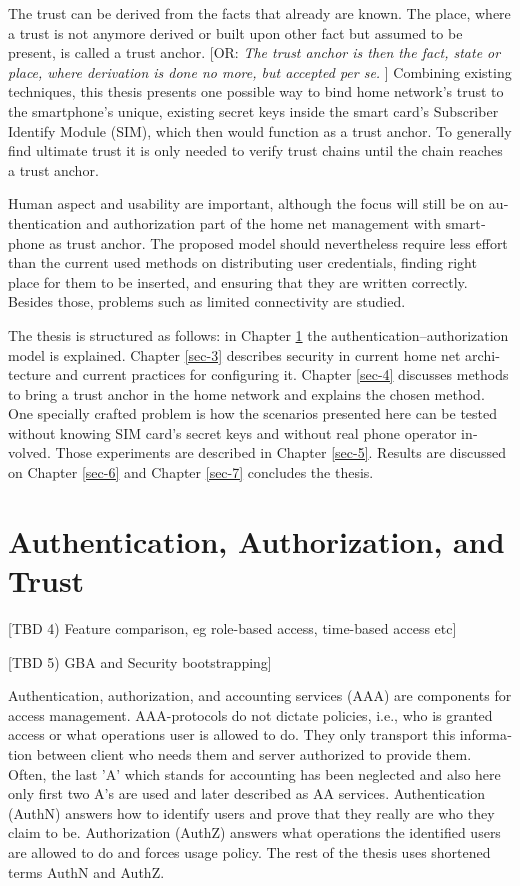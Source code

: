 \documentclass[12pt,a4paper,english]{tutthesis}
\begin{document}
\begin{otherlanguage}{english}
The trust can be derived from the facts that already are known.  The
place, where a trust is not anymore derived or built upon other fact
but assumed to be present, is called a trust anchor.  
[OR: \emph{The trust anchor is then the fact, state or place,
where derivation is done no more, but accepted per se.} ]
Combining existing techniques, this thesis presents one possible way
to bind home network's trust to the smartphone's unique, existing
secret keys inside the smart card's Subscriber Identify Module (SIM),
which then would function as a trust anchor. To generally find
ultimate trust it is only needed to verify trust chains until the
chain reaches a trust anchor.


Human aspect and usability are important, although the focus will
still be on authentication and authorization part of the home net
management with smartphone as trust anchor.  The proposed model
should nevertheless require less effort than the current used methods
on distributing user credentials, finding right place for them to be
inserted, and ensuring that they are written correctly.
Besides those, problems such as limited connectivity are
studied.





The thesis is structured as follows: in Chapter \ref{sec-2} the
authentication--authorization model is explained.  Chapter \ref{sec-3} describes
security in current home net architecture and current practices for
configuring it.  Chapter \ref{sec-4} discusses methods to bring a
trust anchor in the home network and explains the chosen method.
One specially crafted problem is how the scenarios presented here can be
tested without knowing SIM card's secret keys and without real phone
operator involved.  Those experiments are described in Chapter
\ref{sec-5}.
Results are discussed on Chapter \ref{sec-6} and Chapter \ref{sec-7} concludes the
thesis.
\chapter{Authentication, Authorization, and Trust}
\label{sec-2}

[TBD 4) Feature comparison, eg role-based access, time-based access
etc]

[TBD 5) GBA and Security bootstrapping]

Authentication, authorization, and accounting services (AAA) are
components for access management.  AAA-protocols do not dictate
policies, i.e., who is granted access or what operations user is
allowed to do. They only transport this information between client
who needs them and server authorized to provide them.
Often, the last 'A' which stands for accounting has been neglected
and also here only first two A's are used and later described as AA
services. Authentication (AuthN) answers how to identify users and
prove that they really are who they claim to be. Authorization (AuthZ)
answers what operations the identified users are allowed to do and
forces usage policy. The rest of the thesis uses shortened terms AuthN
and AuthZ.


\end{otherlanguage}
\end{document}
